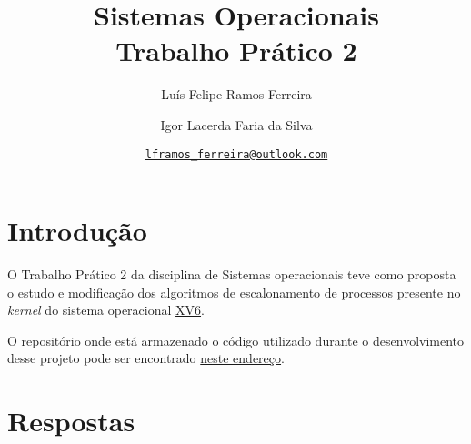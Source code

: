 \documentclass{article}
\title{Sistemas Operacionais \\ \large Trabalho Prático 2}
\author{Luís Felipe Ramos Ferreira \and Igor Lacerda Faria da Silva}
\date{\href{mailto:lframos\_ferreira@outlook.com}{\texttt{lframos\_ferreira@outlook.com}}}
\begin{document}
\maketitle

\section{Introdução}

O Trabalho Prático 2 da disciplina de Sistemas operacionais teve como proposta
o estudo e modificação dos algoritmos de escalonamento de processos presente
no \textit{kernel} do sistema operacional
\href{https://github.com/mit-pdos/xv6-public}{XV6}.

O repositório onde está armazenado o código utilizado durante o desenvolvimento
desse projeto
pode ser encontrado \href{https://github.com/lframosferreira/tp2-so}{neste
      endereço}.

\section{Respostas}
\end{document}
